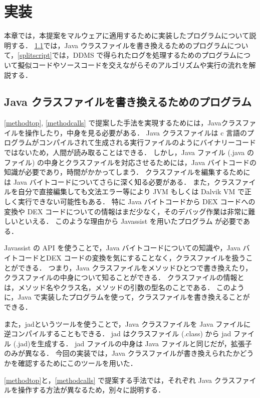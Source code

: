 \section{実装}
\label{sec:instrument}
本章では，本提案をマルウェアに適用するために実装したプログラムについて説明する．
\ref{programforclass}では，Java ウラスファイルを書き換えるためのプログラムについて，\ref{splitscript}では，DDMS で得られたログを処理するためのプログラムについて擬似コードやソースコードを交えながらそのアルゴリズムや実行の流れを解説する．

\subsection{Java クラスファイルを書き換えるためのプログラム}
\label{programforclass}
\ref{methodtop}, \ref{methodcalls} で提案した手法を実現するためには，Javaクラスファイルを操作したり，中身を見る必要がある．
Java クラスファイルは c 言語のプログラムがコンパイルされて生成される実行ファイルのようにバイナリーコードではないため，人間が読み取ることはできる．
しかし，Java ファイル (.java のファイル) の中身とクラスファイルを対応させるためには，Java バイトコードの知識が必要であり，時間がかかってしまう．
クラスファイルを編集するためには Java バイトコードについてさらに深く知る必要がある．
また，クラスファイルを自分で直接編集しても文法エラー等により JVM もしくは Dalvik VM で正しく実行できない可能性もある．
特に Java バイトコードから DEX コードへの変換や DEX コードについての情報はまだ少なく，そのデバッグ作業は非常に難しいといえる．
このような理由から Javassist\cite{javassist} を用いたプログラム が必要である．

Javassist の API を使うことで，Java バイトコードについての知識や，Java バイトコードとDEX コードの変換を気にすることなく，クラスファイルを扱うことができる．
つまり，Java クラスファイルをメソッドひとつで書き換えたり，クラスファイルの中身について知ることができる．
クラスファイルの情報とは，メソッド名やクラス名，メソッドの引数の型名のことである．
このように，Java で実装したプログラムを使って，クラスファイルを書き換えることができる．

また，jad\cite{jad}というツールを使うことで，Java クラスファイルを Java ファイルに逆コンパイルすることもできる．
jad はクラスファイル (.class) から jad ファイル (.jad)を生成する．
jad ファイルの中身は Java ファイルと同じだが，拡張子のみが異なる．
今回の実装では，Java クラスファイルが書き換えられたかどうかを確認するためにこのツールを用いた．

\ref{methodtop}と，\ref{methodcalls} で提案する手法では，それぞれ Java クラスファイルを操作する方法が異なるため，別々に説明する．

